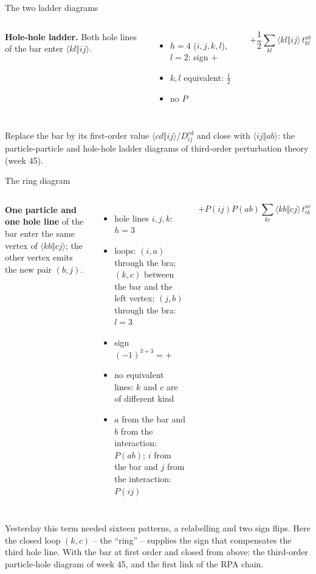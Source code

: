 \documentclass[aspectratio=169,10pt]{beamer}
\newcommand{\as}[4]{\langle #1#2\Vert #3#4\rangle}
\begin{document}
\begin{frame}[shrink=13]{The two ladder diagrams}
\begin{columns}[T]
\vspace{0.6em}
\raggedright
\textbf{Hole-hole ladder.} Both hole lines of the bar enter $\as klij$.
\begin{itemize}
\item $h=4$ ($i,j,k,l$), $l=2$: sign $+$
\item $k,l$ equivalent: $\tfrac12$
\item no $P$
\end{itemize}
\[
 +\frac12\sum_{kl}\as klij\,t_{kl}^{ab}
\]
\end{columns}
\vspace{0.4em}
Replace the bar by its first-order value $\as cdij/D_{ij}^{cd}$ and close with $\as ijab$: the particle-particle and hole-hole ladder diagrams of third-order perturbation theory (week 45).
\end{frame}

\begin{frame}[shrink=1]{The ring diagram}
\small
\begin{columns}[T]
\centering
{}
\textbf{One particle and one hole line} of the bar enter the same vertex of $\as kbcj$; the other vertex emits the new pair $(b,j)$.
\begin{itemize}
\item hole lines $i,j,k$: $h=3$
\item loops: $(i,a)$ through the bra; $(k,c)$ between the bar and the left vertex; $(j,b)$ through the bra: $l=3$
\item sign $(-1)^{3+3}=+$
\item no equivalent lines: $k$ and $c$ are of different kind
\item $a$ from the bar and $b$ from the interaction: $P(ab)$; $i$ from the bar and $j$ from the interaction: $P(ij)$
\end{itemize}
\[
 +P(ij)P(ab)\sum_{kc}\as kbcj\,t_{ik}^{ac}
\]
\end{columns}
\vspace{0.5em}
Yesterday this term needed sixteen patterns, a relabelling and two sign flips. Here the closed loop $(k,c)$ -- the ``ring'' -- supplies the sign that compensates the third hole line. With the bar at first order and closed from above: the third-order particle-hole diagram of week 45, and the first link of the RPA chain.
\end{frame}
\end{document}
